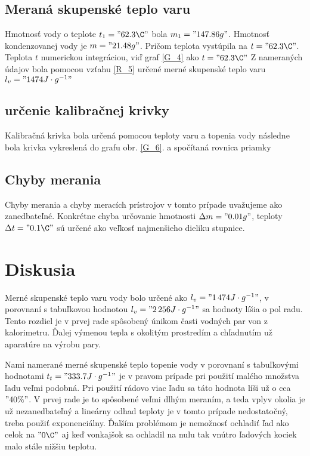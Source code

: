 \documentclass[a4paper,10pt]{article}
\begin{document}
\subsection{Meraná skupenské teplo varu}
Hmotnosť vody o teplote $t_1="62.3 \C"$ bola $m_1="147.86 g"$. 
Hmotnosť kondenzovanej vody je $m="21.48 g"$. 
Pričom teplota vystúpila na $t="62.3 \C"$. 
Teplota $t$ numerickou integráciou, viď graf \ref{G_4} ako $t="62.3 \C"$
Z nameraných údajov bola pomocou vzťahu \ref{R_5} určené merné skupenské teplo varu $l_v = "1474 J\cdot g^{-1}"$




\subsection{určenie kalibračnej krivky}

Kalibračná krivka bola určená pomocou teploty varu a topenia vody
následne bola krivka vykreslená do grafu obr. \ref{G_6}. a spočítaná rovnica priamky
\subsection{Chyby merania}
Chyby merania a chyby meracích prístrojov v tomto prípade uvažujeme ako zanedbateľné.
Konkrétne chyba určovanie hmotnosti $\Delta m = "0.01 g"$, teploty $\Delta t = "0.1 \C"$ sú určené ako veľkosť najmenšieho dieliku stupnice.

\section{Diskusia}

Merné skupenské teplo varu vody bolo určené ako $l_v = "1\,474 J\cdot g^{-1}"$, 
v porovnaní s tabuľkovou hodnotou $l_v = "2\,256 J\cdot g^{-1}"$ sa hodnoty líšia o pol radu. 
Tento rozdiel je v prvej rade spôsobený únikom časti vodných par von z kalorimetru. 
Ďalej výmenou tepla s okolitým prostredím a chľadnutím už aparatúre na výrobu pary.

Nami namerané merné skupenské teplo topenie vody v porovnaní s tabuľkovými 
hodnotami \cite{C_2} $t_t = "333.7 J\cdot g^{-1}"$ je v pravom prípade pri použití malého množstva ľadu veľmi podobná. 
Pri použití rádovo viac ľadu sa táto hodnota líši už o cca $"40 \%"$. 
V prvej rade je to spôsobené veľmi dlhým meraním, a teda vplyv okolia 
je už nezanedbateľný a lineárny odhad teploty je v tomto prípade nedostatočný, treba použiť exponenciálny.
Ďalším problémom je nemožnosť ochladiť ľad ako celok na $"0 \C"$ aj 
keď vonkajšok sa ochladil na nulu tak vnútro ľadových kociek malo stále nižšiu teplotu.
\end{document}
